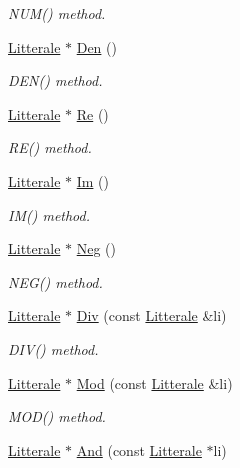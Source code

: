 \begin{DoxyCompactItemize}
\begin{DoxyCompactList}\small\item\em N\+U\+M() method. \end{DoxyCompactList}\item 
\hyperlink{class_litterale}{Litterale} $\ast$ \hyperlink{class_li_expression_ab135c92b3d0378fea00a60f096fab7d6}{Den} ()
\begin{DoxyCompactList}\small\item\em D\+E\+N() method. \end{DoxyCompactList}\item 
\hyperlink{class_litterale}{Litterale} $\ast$ \hyperlink{class_li_expression_ae1a4046463009818bd96794ba65bd6b4}{Re} ()
\begin{DoxyCompactList}\small\item\em R\+E() method. \end{DoxyCompactList}\item 
\hyperlink{class_litterale}{Litterale} $\ast$ \hyperlink{class_li_expression_ac9f9dae0e22ae52c5c8e92a3b4dc6a2a}{Im} ()
\begin{DoxyCompactList}\small\item\em I\+M() method. \end{DoxyCompactList}\item 
\hyperlink{class_litterale}{Litterale} $\ast$ \hyperlink{class_li_expression_a0bf45253ed1ac7d76d0950f5368f634c}{Neg} ()
\begin{DoxyCompactList}\small\item\em N\+E\+G() method. \end{DoxyCompactList}\item 
\hyperlink{class_litterale}{Litterale} $\ast$ \hyperlink{class_li_expression_afc9c8a7d8d16b6b834708daa1c8bb431}{Div} (const \hyperlink{class_litterale}{Litterale} \&li)
\begin{DoxyCompactList}\small\item\em D\+I\+V() method. \end{DoxyCompactList}\item 
\hyperlink{class_litterale}{Litterale} $\ast$ \hyperlink{class_li_expression_adb379aef8c3782698a76bc56d0c6758d}{Mod} (const \hyperlink{class_litterale}{Litterale} \&li)
\begin{DoxyCompactList}\small\item\em M\+O\+D() method. \end{DoxyCompactList}\item 
\hyperlink{class_litterale}{Litterale} $\ast$ \hyperlink{class_li_expression_a6e29f5bd106989a72e8096d3481fd326}{And} (const \hyperlink{class_litterale}{Litterale} $\ast$li)

\end{DoxyCompactItemize}
